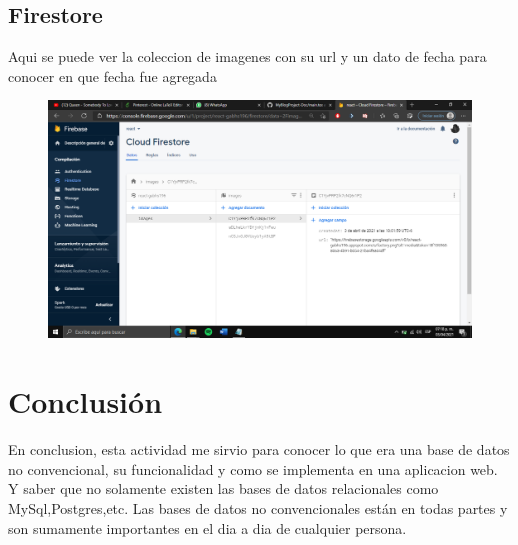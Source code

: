 \documentclass[60pt]{article}
\begin{document}
\subsection{Firestore}
Aqui se puede ver la coleccion de imagenes con su url y un dato de fecha para conocer en que fecha fue agregada
\begin{figure}[htb]
\centering
\includegraphics[width=1\linewidth]{firestore.png}
\end{figure}

\section{Conclusión}
En conclusion, esta actividad me sirvio para conocer lo que era una base de datos no convencional, su funcionalidad y como se implementa en una aplicacion web. Y saber que no solamente existen las bases de datos relacionales como MySql,Postgres,etc. Las bases de datos no convencionales están en todas partes y son sumamente importantes en el dia a dia de cualquier persona.
\end{document}
